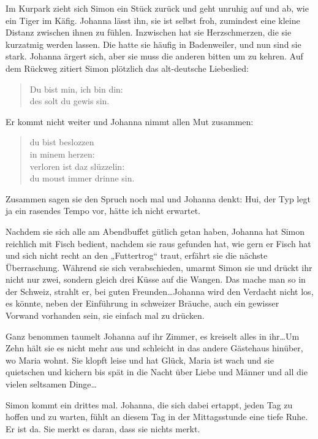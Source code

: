 \documentclass[10pt,titlepage,a5paper]{book}
\begin{document}
Im Kurpark zieht sich Simon ein Stück zurück und geht unruhig auf und ab, wie ein Tiger im Käfig. Johanna lässt ihn, sie ist selbst froh, zumindest eine kleine Distanz zwischen ihnen zu fühlen. Inzwischen hat sie Herzschmerzen, die sie kurzatmig werden lassen. Die hatte sie häufig in Badenweiler, und nun sind sie stark. Johanna ärgert sich, aber sie muss die anderen bitten um zu kehren. Auf dem Rückweg zitiert Simon plötzlich das alt-deutsche Liebeslied:


\begin{verse}
Du bist min, ich bin din:\\
des solt du gewis sin.
\end{verse}
Er kommt nicht weiter und Johanna nimmt allen Mut zusammen:

\begin{verse}
du bist beslozzen\\
in minem herzen:\\
verloren ist daz slüzzelin:\\
du moust immer drinne sin.
\end{verse}

Zusammen sagen sie den Spruch noch mal und Johanna denkt: Hui, der Typ legt ja ein rasendes Tempo vor, hätte ich nicht erwartet.

Nachdem sie sich alle am Abendbuffet gütlich getan haben, Johanna hat Simon reichlich mit Fisch bedient, nachdem sie raus gefunden hat, wie gern er Fisch hat und sich nicht recht an den „Futtertrog“ traut, erfährt sie die nächste Überraschung. Während sie sich verabschieden, umarmt Simon sie und drückt ihr nicht nur zwei, sondern gleich drei Küsse auf die Wangen. Das mache man so in der Schweiz, strahlt er, bei guten Freunden\dots  Johanna wird den Verdacht nicht los, es könnte, neben der Einführung in schweizer Bräuche, auch ein gewisser Vorwand vorhanden sein, sie einfach mal zu drücken. 

Ganz benommen taumelt Johanna auf ihr Zimmer, es kreiselt alles in ihr\dots  Um Zehn hält sie es nicht mehr aus und schleicht in das andere Gästehaus hinüber, wo Maria wohnt. Sie klopft leise und hat Glück, Maria ist wach und sie quietschen und kichern bis spät in die Nacht über Liebe und Männer und all die vielen seltsamen Dinge\dots 

Simon kommt ein drittes mal. Johanna, die sich dabei ertappt, jeden Tag zu hoffen und zu warten, fühlt an diesem Tag in der Mittagsstunde eine tiefe Ruhe. Er ist da. Sie merkt es daran, dass sie nichts merkt.
\end{document}
